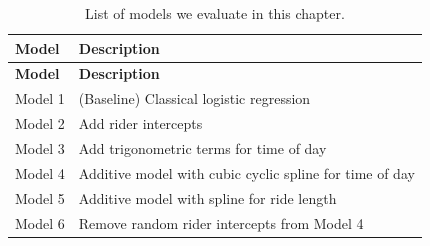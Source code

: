 \documentclass[]{article}
\begin{document}
\begin{longtable}[c]{@{}ll@{}}
\caption{List of models we evaluate in this chapter.
\label{tab:models}}\tabularnewline
\toprule
\begin{minipage}[b]{0.13\columnwidth}\raggedright\strut
\textbf{Model}
\strut\end{minipage} &
\begin{minipage}[b]{0.72\columnwidth}\raggedright\strut
\textbf{Description}
\strut\end{minipage}\tabularnewline
\midrule
\endfirsthead
\toprule
\begin{minipage}[b]{0.13\columnwidth}\raggedright\strut
\textbf{Model}
\strut\end{minipage} &
\begin{minipage}[b]{0.72\columnwidth}\raggedright\strut
\textbf{Description}
\strut\end{minipage}\tabularnewline
\midrule
\endhead
\begin{minipage}[t]{0.13\columnwidth}\raggedright\strut
Model 1
\strut\end{minipage} &
\begin{minipage}[t]{0.72\columnwidth}\raggedright\strut
(Baseline) Classical logistic regression
\strut\end{minipage}\tabularnewline
\begin{minipage}[t]{0.13\columnwidth}\raggedright\strut
Model 2
\strut\end{minipage} &
\begin{minipage}[t]{0.72\columnwidth}\raggedright\strut
Add rider intercepts
\strut\end{minipage}\tabularnewline
\begin{minipage}[t]{0.13\columnwidth}\raggedright\strut
Model 3
\strut\end{minipage} &
\begin{minipage}[t]{0.72\columnwidth}\raggedright\strut
Add trigonometric terms for time of day
\strut\end{minipage}\tabularnewline
\begin{minipage}[t]{0.13\columnwidth}\raggedright\strut
Model 4
\strut\end{minipage} &
\begin{minipage}[t]{0.72\columnwidth}\raggedright\strut
Additive model with cubic cyclic spline for time of day
\strut\end{minipage}\tabularnewline
\begin{minipage}[t]{0.13\columnwidth}\raggedright\strut
Model 5
\strut\end{minipage} &
\begin{minipage}[t]{0.72\columnwidth}\raggedright\strut
Additive model with spline for ride length
\strut\end{minipage}\tabularnewline
\begin{minipage}[t]{0.13\columnwidth}\raggedright\strut
Model 6
\strut\end{minipage} &
\begin{minipage}[t]{0.72\columnwidth}\raggedright\strut
Remove random rider intercepts from Model 4
\strut\end{minipage}\tabularnewline
\bottomrule
\end{longtable}
\end{document}
